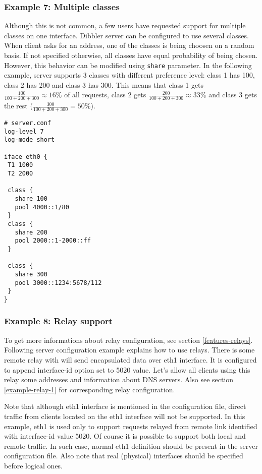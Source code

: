 \subsubsection{Example 7: Multiple classes}
Although this is not common, a few users have requested support for multiple classes on one interface.
Dibbler server can be configured to use several classes. When client asks for an address, one of the classes
is being choosen on a random basis. If not specified otherwise, all classes have equal probability of being chosen.
However, this behavior can be modified using \verb+share+ parameter. In the following example, server supports
3 classes with different preference level: class 1 has 100, class 2 has 200 and class 3 has 300. This means that class 1
gets $\frac{100}{100+200+300} \approx 16\% $ of all requests, class 2
gets $\frac{200}{100+200+300} \approx 33\% $ and class 3 gets the rest 
($\frac{300}{100+200+300}=50\% $).

\begin{lstlisting}
# server.conf
log-level 7
log-mode short

iface eth0 {
 T1 1000
 T2 2000

 class {
   share 100
   pool 4000::1/80
 }
 class {
   share 200
   pool 2000::1-2000::ff
 }

 class {
   share 300
   pool 3000::1234:5678/112
 }
}
\end{lstlisting}

\subsubsection{Example 8: Relay support}
\label{example-server-relay1}
To get more informations about relay configuration, see section \ref{features-relays}.
Following server configuration example explains how to use
relays. There is some remote relay with will send encapsulated data over
eth1 interface. It is configured to append interface-id option set to
5020 value. Let's allow all clients using this relay some addresses
and information about DNS servers. Also see section
\ref{example-relay-1} for corresponding relay configuration. 

Note that although eth1 interface is mentioned in the configuration file,
direct traffic from clients located on the eth1 interface will not be
supported. In this example, eth1 is used only to support requests
relayed from remote link identified with interface-id value 5020.
Of course it is possible to support both local and remote traffic. In
such case, normal eth1 definition should be present in the server
configuration file. Also note that real (physical) interfaces should
be specified before logical ones.

